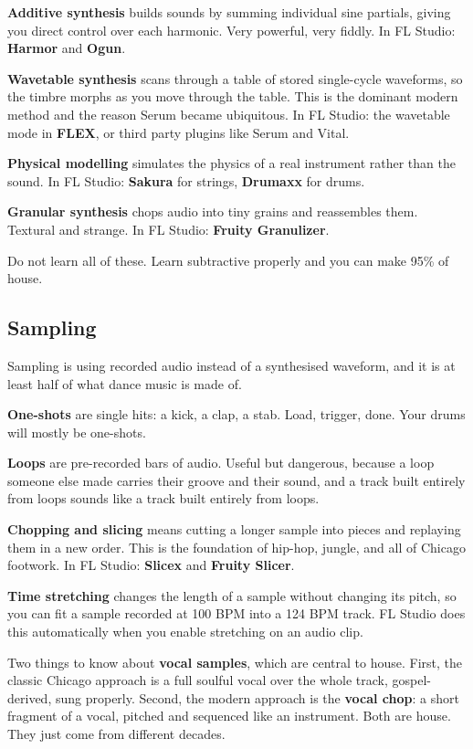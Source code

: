 \textbf{Additive synthesis} builds sounds by summing individual sine partials, giving you direct
control over each harmonic. Very powerful, very fiddly. In FL Studio: \textbf{Harmor} and
\textbf{Ogun}.

\textbf{Wavetable synthesis} scans through a table of stored single-cycle waveforms, so the
timbre morphs as you move through the table. This is the dominant modern method and the
reason Serum became ubiquitous. In FL Studio: the wavetable mode in \textbf{FLEX}, or third
party plugins like Serum and Vital.

\textbf{Physical modelling} simulates the physics of a real instrument rather than the sound. In
FL Studio: \textbf{Sakura} for strings, \textbf{Drumaxx} for drums.

\textbf{Granular synthesis} chops audio into tiny grains and reassembles them. Textural and
strange. In FL Studio: \textbf{Fruity Granulizer}.

Do not learn all of these. Learn subtractive properly and you can make 95\% of house.

\subsection{Sampling}\label{th05_sound_design-sampling}

Sampling is using recorded audio instead of a synthesised waveform, and it is at least half
of what dance music is made of.

\textbf{One-shots} are single hits: a kick, a clap, a stab. Load, trigger, done. Your drums will
mostly be one-shots.

\textbf{Loops} are pre-recorded bars of audio. Useful but dangerous, because a loop someone else
made carries their groove and their sound, and a track built entirely from loops sounds like
a track built entirely from loops.

\textbf{Chopping and slicing} means cutting a longer sample into pieces and replaying them in a
new order. This is the foundation of hip-hop, jungle, and all of Chicago footwork. In FL
Studio: \textbf{Slicex} and \textbf{Fruity Slicer}.

\textbf{Time stretching} changes the length of a sample without changing its pitch, so you can
fit a sample recorded at 100 BPM into a 124 BPM track. FL Studio does this automatically
when you enable stretching on an audio clip.

Two things to know about \textbf{vocal samples}, which are central to house. First, the classic
Chicago approach is a full soulful vocal over the whole track, gospel-derived, sung properly.
Second, the modern approach is the \textbf{vocal chop}: a short fragment of a vocal, pitched and
sequenced like an instrument. Both are house. They just come from different decades.

